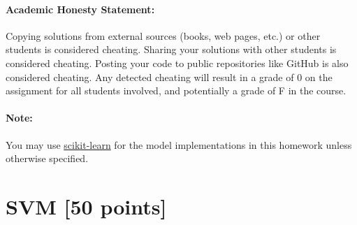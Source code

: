 \documentclass[letterpaper]{article}
\begin{document}
\paragraph*{Academic Honesty Statement:} Copying solutions from external sources (books, web pages, etc.) or other students is considered cheating. Sharing your solutions with other students is  considered cheating. Posting your code to public repositories like GitHub is also considered cheating. Any detected cheating will result in a grade of 0 on the assignment for all students involved, and potentially a grade of F in the course.

\paragraph*{Note:} You may use \underline{scikit-learn} for the model implementations in this homework unless otherwise specified. \\
\section{SVM [50 points]}
\end{document}
